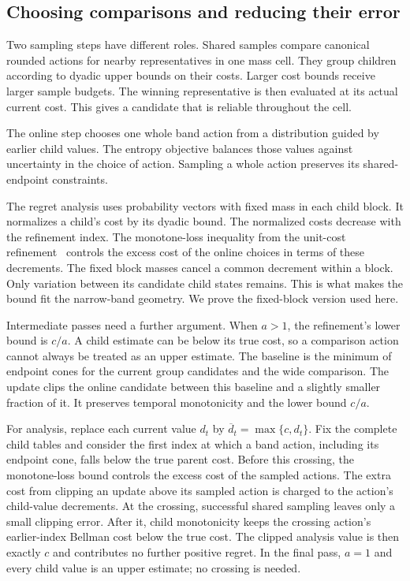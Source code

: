 \documentclass[11pt]{article}
\theoremstyle{definition}
\newcommand{\1}{\mathbf 1}
\begin{document}
\subsection{Choosing comparisons and reducing their error}

Two sampling steps have different roles.
Shared samples compare canonical rounded actions for nearby
representatives in one mass cell.
They group children according to dyadic upper bounds on their costs.
Larger cost bounds receive larger sample budgets.
The winning representative is then evaluated at its actual current
cost. This gives a candidate that is reliable throughout the cell.

The online step chooses one whole band action from a distribution
guided by earlier child values.
The entropy objective balances those values against uncertainty in
the choice of action.
Sampling a whole action preserves its shared-endpoint constraints.

The regret analysis uses probability vectors with fixed mass in each
child block. It normalizes a child's cost by its dyadic bound.
The normalized costs decrease with the refinement index.
The monotone-loss inequality from the unit-cost refinement~\cite{openai}
controls the excess
cost of the online choices in terms of these decrements.
The fixed block masses cancel a common decrement within a block.
Only variation between its candidate child states remains.
This is what makes the bound fit the narrow-band geometry.
We prove the fixed-block version used here.

Intermediate passes need a further argument.
When $a>1$, the refinement's lower bound is $c/a$.
A child estimate can be below its true cost, so a comparison action
cannot always be treated as an upper estimate.
The baseline is the minimum of endpoint cones for the current group
candidates and the wide comparison. The update clips the online
candidate between this baseline and a slightly smaller fraction of it.
It preserves temporal monotonicity and the lower bound $c/a$.

For analysis, replace each current value $d_t$ by
$\overline d_t=\max\{c,d_t\}$.
Fix the complete child tables and consider the first index at which
a band action, including its endpoint cone, falls below the true
parent cost.
Before this crossing, the monotone-loss bound controls the excess
cost of the sampled actions. The extra cost from clipping an update
above its sampled action is charged to the action's child-value
decrements.
At the crossing, successful shared sampling leaves only a small
clipping error.
After it, child monotonicity keeps the crossing action's
earlier-index Bellman cost below the true cost.
The clipped analysis value is then exactly $c$ and contributes no
further positive regret.
In the final pass, $a=1$ and every child value is an upper estimate;
no crossing is needed.
\end{document}
